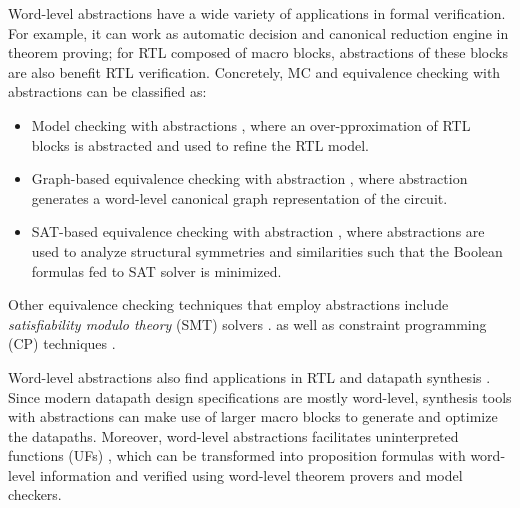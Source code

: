 Word-level abstractions have a wide variety of applications in formal 
verification. For example, it can work as automatic decision and canonical reduction engine in theorem proving;
for RTL composed of macro blocks, abstractions of these blocks are also benefit RTL verification.
Concretely, MC and equivalence checking with abstractions can be classified as:
\begin{itemize}  
\item Model checking with abstractions \cite{kroening:model}, 
where an over-pproximation of RTL blocks is abstracted and used to 
refine the RTL model.
\item Graph-based equivalence 
checking with abstraction \cite{WLS,arditi:bmd}, where abstraction 
generates a word-level canonical graph representation of the circuit.
\item SAT-based equivalence checking with abstraction \cite{lpsat}, where 
abstractions are used to analyze structural symmetries and similarities such that
the Boolean formulas fed to SAT solver is minimized.
\end{itemize}

Other equivalence checking techniques that employ abstractions 
include {\it satisfiability modulo theory} (SMT) solvers \cite{boolector,bryant:tacas07}.
as well as constraint programming (CP) techniques \cite{ms:research,tew:iccad08}.



Word-level abstractions also find applications in RTL and datapath 
synthesis \cite{demicheli:iccad_98,demicheli:dac_99,demicheli:tcad_03}. 
Since modern datapath design specifications are mostly word-level, synthesis tools with abstractions
can make use of larger macro blocks to generate and optimize the
datapaths. Moreover, 
word-level abstractions facilitates uninterpreted functions (UFs) \cite{UF3}, which 
can be transformed into proposition formulas with word-level information and verified using 
word-level theorem provers and model checkers.

